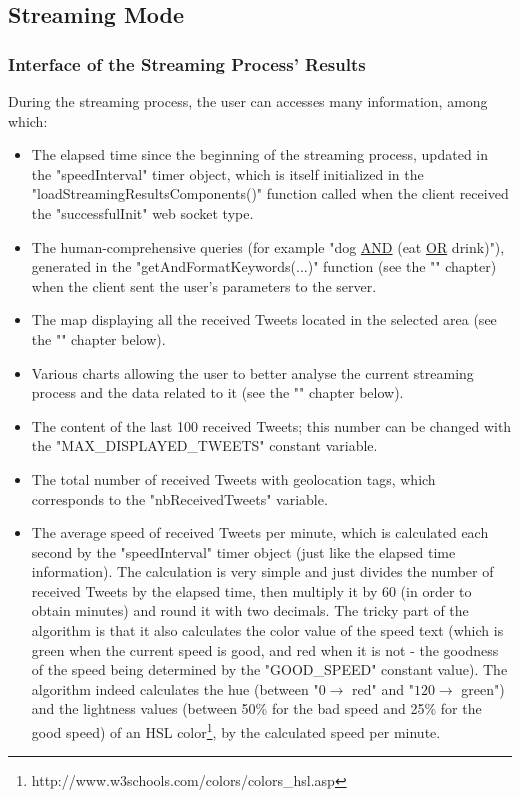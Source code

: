 \documentclass[a4paper,11pt]{report}
\begin{document}
\subsection{Streaming Mode}
\subsubsection{Interface of the Streaming Process' Results}
During the streaming process, the user can accesses many information, among which:
\begin{itemize}
	\item The elapsed time since the beginning of the streaming process, updated in the "speedInterval" timer object, which is itself initialized in the "loadStreamingResultsComponents()" function called when the client received the "successfulInit" web socket type.
	\item The human-comprehensive queries (for example "dog \underline{AND} (eat \underline{OR} drink)"), generated in the "getAndFormatKeywords(...)" function (see the "" chapter) when the client sent the user's parameters to the server.
	\item The map displaying all the received Tweets located in the selected area (see the "" chapter below).
	\item Various charts allowing the user to better analyse the current streaming process and the data related to it (see the "" chapter below).
	\item The content of the last 100 received Tweets; this number can be changed with the "MAX\_DISPLAYED\_TWEETS" constant variable.
	\item The total number of received Tweets with geolocation tags, which corresponds to the "nbReceivedTweets" variable.
	\item The average speed of received Tweets per minute, which is calculated each second by the "speedInterval" timer object (just like the elapsed time information). The calculation is very simple and just divides the number of received Tweets by the elapsed time, then multiply it by 60 (in order to obtain minutes) and round it with two decimals.
The tricky part of the algorithm is that it also calculates the color value of the speed text (which is green when the current speed is good, and red when it is not - the goodness of the speed being determined by the "GOOD\_SPEED" constant value). The algorithm indeed calculates the hue (between "$0\to$ red" and "$120\to$ green") and the lightness values (between 50\% for the bad speed and 25\% for the good speed) of an HSL color\footnote{http://www.w3schools.com/colors/colors\_hsl.asp}, by the calculated speed per minute.

\end{itemize}
\end{document}
